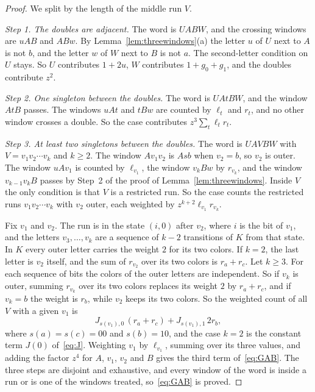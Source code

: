 \begin{proof}
We split by the length of the middle run $V$.

\emph{Step 1. The doubles are adjacent.} The word is $UABW$, and the crossing windows are $uAB$
and $ABw$. By Lemma~\ref{lem:threewindows}(a) the letter $u$ of $U$ next to $A$ is not $b$,
and the letter $w$ of $W$ next to $B$ is not $a$. The second-letter condition on $U$ stays.
So $U$ contributes $1+2u$, $W$ contributes $1+g_0+g_1$, and the doubles contribute $z^2$.

\emph{Step 2. One singleton between the doubles.} The word is $UAtBW$, and the window $AtB$
passes. The windows $uAt$ and $tBw$ are counted by $\ell_t$ and $r_t$, and no other window
crosses a double. So the case contributes $z^3\sum_t\ell_tr_t$.

\emph{Step 3. At least two singletons between the doubles.} The word is $UAVBW$ with
$V=v_1v_2\cdots v_k$ and $k\ge2$. The window $Av_1v_2$ is $Asb$ when $v_2=b$, so $v_2$ is
outer. The window $uAv_1$ is counted by $\ell_{v_1}$, the window $v_kBw$ by $r_{v_k}$, and
the window $v_{k-1}v_kB$ passes by Step~2 of the proof of Lemma~\ref{lem:threewindows}.
Inside $V$ the only condition is that $V$ is a restricted run. So the case counts the
restricted runs $v_1v_2\cdots v_k$ with $v_2$ outer, each weighted by
$z^{k+2}\ell_{v_1}r_{v_k}$.

Fix $v_1$ and $v_2$. The run is in the state $(i,0)$ after $v_2$, where $i$ is the bit of
$v_1$, and the letters $v_3,\dots,v_k$ are a sequence of $k-2$ transitions of $K$ from that
state. In $K$ every outer letter carries the weight $2$ for its two colors. If $k=2$, the
last letter is $v_2$ itself, and the sum of $r_{v_2}$ over its two colors is $r_a+r_c$. Let
$k\ge3$. For each sequence of bits the colors of the outer letters are independent. So if
$v_k$ is outer, summing $r_{v_k}$ over its two colors replaces its weight $2$ by $r_a+r_c$,
and if $v_k=b$ the weight is $r_b$, while $v_2$ keeps its two colors. So the weighted count
of all $V$ with a given $v_1$ is
\[
J_{s(v_1),0}\,(r_a+r_c)+J_{s(v_1),1}\,2r_b,
\]
where $s(a)=s(c)=00$ and $s(b)=10$, and the case $k=2$ is the constant term $J(0)$
of~\eqref{eq:J}. Weighting $v_1$ by $\ell_{v_1}$, summing over its three values, and adding
the factor $z^4$ for $A$, $v_1$, $v_2$ and $B$ gives the third term of~\eqref{eq:GAB}. The
three steps are disjoint and exhaustive, and every window of the word is inside a run or is
one of the windows treated, so~\eqref{eq:GAB} is proved.


\end{proof}
